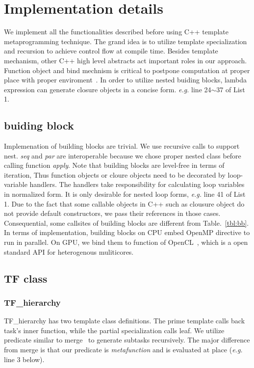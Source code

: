 \section{Implementation details}\label{sec:details}
We implement all the functionalities described before using C++
template metaprogramming technique. The grand idea is to utilize
template specialization and recursion to achieve control flow at
compile time. Besides template mechanism, other  C++ high level
abstracts act important roles in our approach. Function object and bind
mechnism is critical to postpone computation at proper place with
proper enviroment~\cite{moderncpp}. In order to utilize nested buiding blocks,
lambda expression can generate closure objects in a concise
form. \textit{e.g.} line 24$\sim$37 of List 1.

\subsection{buiding block}
Implemenation of building blocks are trivial. We use recursive calls
to support nest. \textit{seq} and \textit{par} are interoperable
because we chose proper nested class before calling function \textit{apply}. Note that
building blocks are level-free in terms of iteration, Thus function objects
or cloure objects need to be decorated by loop-variable handlers. The
handlers take responsibility for calculating loop variables in
normalized form. It is only desirable for nested loop forms,
\textit{e.g.} line 41 of List 1. Due to the fact that some callable
objects in C++ such
as clousure object
do not provide default constructors, we pass their
references in those cases.  Consequential, some callsites of building blocks are different
from Table.~\ref{tbl:bb}. In terms of implementation, building blocks
on CPU embed OpenMP directive to run in parallel. On GPU, we bind
them to function of OpenCL~\cite{opencl}, which is a open standard API for heterogenous muliticores.

\subsection{TF class}
\subsubsection{TF\_hierarchy}
TF\_hierarchy has two template class definitions. The prime template
calls back task's inner function, while the partial specialization calls
leaf. We utilize predicate similar to merge~\cite{merge} to generate subtasks
recursively. The major difference from merge is that our predicate is
\textit{metafunction} and is evaluated at place (\textit{e.g.} line 3 below).

